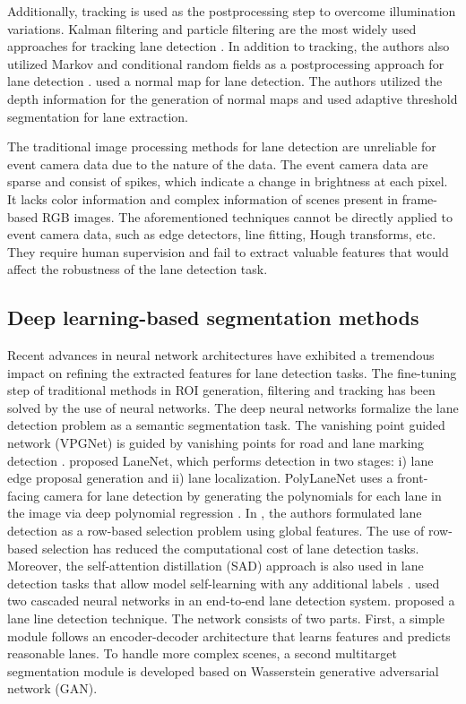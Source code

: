 \documentclass[journal]{IEEEtran}
\begin{document}
Additionally, tracking is used as the postprocessing step to overcome illumination variations. Kalman filtering and particle filtering are the most widely used approaches for tracking lane detection \cite{Liang2017} \cite{Shin2015}. In addition to tracking, the authors also utilized Markov and conditional random fields as a postprocessing approach for lane detection \cite{Philipp2011}. \cite{Yuan2018} used a normal map for lane detection. The authors utilized the depth information for the generation of normal maps and used adaptive threshold segmentation for lane extraction.
\par
The traditional image processing methods for lane detection are unreliable for event camera data due to the nature of the data. The event camera data are sparse and consist of spikes, which indicate a change in brightness at each pixel. It lacks color information and complex information of scenes present in frame-based RGB images. The aforementioned techniques cannot be directly applied to event camera data, such as edge detectors, line fitting, Hough transforms, etc. They require human supervision and fail to extract valuable features that would affect the robustness of the lane detection task. 
\par
\subsection{Deep learning-based segmentation methods}
Recent advances in neural network architectures have exhibited a tremendous impact on refining the extracted features for lane detection tasks. The fine-tuning step of traditional methods in ROI generation, filtering and tracking has been solved by the use of neural networks. The deep neural networks formalize the lane detection problem as a semantic segmentation task. The vanishing point guided network (VPGNet) is guided by vanishing points for road and lane marking detection \cite{Lee2017}. \cite{Wang2018} proposed LaneNet, which performs detection in two stages: i) lane edge proposal generation and ii) lane localization. PolyLaneNet uses a front-facing camera for lane detection by generating the polynomials for each lane in the image via deep polynomial regression \cite{Tabelini2020}\cite{koy}. In \cite{Qin2020}, the authors formulated lane detection as a row-based selection problem using global features. The use of row-based selection has reduced the computational cost of lane detection tasks. Moreover, the self-attention distillation (SAD) approach is also used in lane detection tasks that allow model self-learning with any additional labels \cite{Hou2019}. \cite{Pizzati2019} used two cascaded neural networks in an end-to-end lane detection system. 
\cite{you2021} proposed a lane line detection technique. The network consists of two parts. First, a simple module follows an encoder-decoder architecture that learns features and predicts reasonable lanes. To handle more complex scenes, a second multitarget segmentation module is developed based on Wasserstein generative adversarial network (GAN). 
\end{document}
